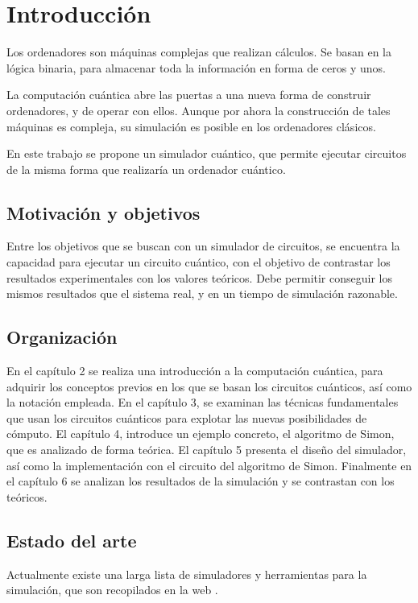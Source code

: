 \chapter{Introducción}

Los ordenadores son máquinas complejas que realizan cálculos. Se basan en la 
lógica binaria, para almacenar toda la información en forma de ceros y unos.

La computación cuántica abre las puertas a una nueva forma de construir 
ordenadores, y de operar con ellos. Aunque por ahora la construcción de tales 
máquinas es compleja, su simulación es posible en los ordenadores clásicos.

En este trabajo se propone un simulador cuántico, que permite ejecutar circuitos 
de la misma forma que realizaría un ordenador cuántico.

\section{Motivación y objetivos}

Entre los objetivos que se buscan con un simulador de circuitos, se encuentra la 
capacidad para ejecutar un circuito cuántico, con el objetivo de contrastar los 
resultados experimentales con los valores teóricos. Debe permitir conseguir los 
mismos resultados que el sistema real, y en un tiempo de simulación razonable.

%

\section{Organización}

En el capítulo 2 se realiza una introducción a la computación cuántica, para 
adquirir los conceptos previos en los que se basan los circuitos cuánticos, así 
como la notación empleada. En el capítulo 3, se examinan las técnicas 
fundamentales que usan los circuitos cuánticos para explotar las nuevas 
posibilidades de cómputo. El capítulo 4, introduce un ejemplo concreto, el 
algoritmo de Simon, que es analizado de forma teórica. El capítulo 5 presenta el 
diseño del simulador, así como la implementación con el circuito del algoritmo 
de Simon. Finalmente en el capítulo 6 se analizan los resultados de la 
simulación y se contrastan con los teóricos.

\section{Estado del arte}
Actualmente existe una larga lista de simuladores y herramientas para la 
simulación, que son recopilados en la web \cite{quantiki}.





